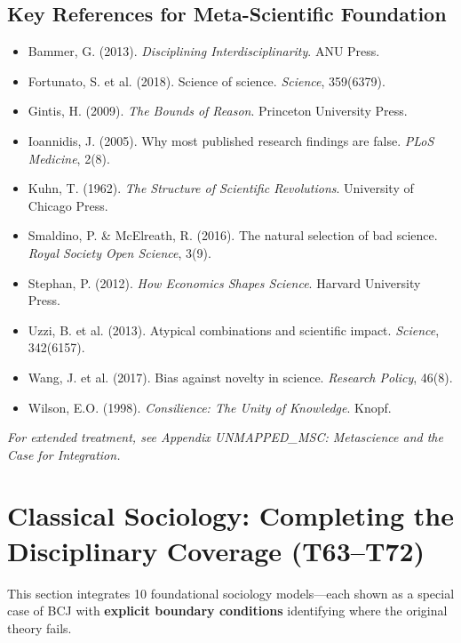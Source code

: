 \subsection{Key References for Meta-Scientific Foundation}

\begin{itemize}[nosep]
\item Bammer, G. (2013). \textit{Disciplining Interdisciplinarity}. ANU Press.
\item Fortunato, S. et al. (2018). Science of science. \textit{Science}, 359(6379).
\item Gintis, H. (2009). \textit{The Bounds of Reason}. Princeton University Press.
\item Ioannidis, J. (2005). Why most published research findings are false. \textit{PLoS Medicine}, 2(8).
\item Kuhn, T. (1962). \textit{The Structure of Scientific Revolutions}. University of Chicago Press.
\item Smaldino, P. \& McElreath, R. (2016). The natural selection of bad science. \textit{Royal Society Open Science}, 3(9).
\item Stephan, P. (2012). \textit{How Economics Shapes Science}. Harvard University Press.
\item Uzzi, B. et al. (2013). Atypical combinations and scientific impact. \textit{Science}, 342(6157).
\item Wang, J. et al. (2017). Bias against novelty in science. \textit{Research Policy}, 46(8).
\item Wilson, E.O. (1998). \textit{Consilience: The Unity of Knowledge}. Knopf.
\end{itemize}

\textit{For extended treatment, see Appendix UNMAPPED_MSC: Metascience and the Case for Integration.}



\section{Classical Sociology: Completing the Disciplinary Coverage (T63--T72)}
\label{sec:bcj-sociology}

This section integrates 10 foundational sociology models---each shown as a special case of BCJ with \textbf{explicit boundary conditions} identifying where the original theory fails.

